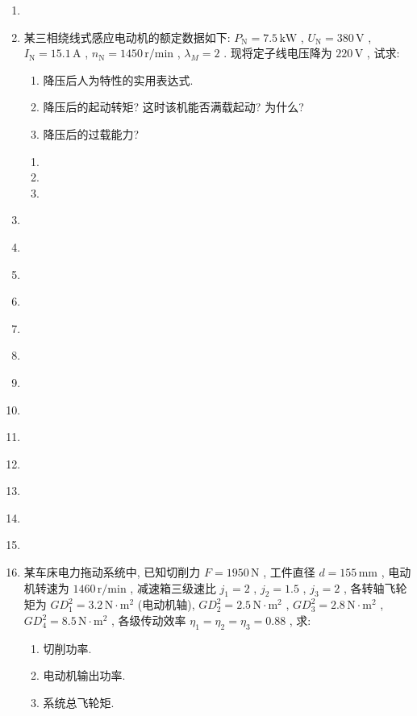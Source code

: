 \documentclass[lang=cn,11pt,marginpar=margintrue]{elegantbook}%
\newcommand{\zt}[1]{\,\mathrm{#1}}
\newcommand{\NN}{\mathrm{N}}
\begin{document}
\begin{enumerate}
	\item \label{js:11}
	




	\item \label{js:12}某三相绕线式感应电动机的额定数据如下: $P_{\NN}=7.5\zt{kW}$ , $U_{\NN}=380\zt{V}$ , $I_{\NN}=15.1\zt{A}$ , $n_{\NN}=1450\zt{r/min}$ , $\lambda_{M}=2$ . 现将定子线电压降为 $220\zt{V}$ , 试求:
	\begin{enumerate}
		\item 降压后人为特性的实用表达式.
		\item 降压后的起动转矩? 这时该机能否满载起动? 为什么?
		\item 降压后的过载能力?
	\end{enumerate}
	\begin{solution}
		\begin{enumerate}
			\item 
			\item 
			\item 
		\end{enumerate}
	\end{solution}
	\item \label{js:13}
	\item \label{js:14}
	\item \label{js:15}
	\item \label{js:16}
	\item \label{js:17}
	\item \label{js:18}
	\item \label{js:19}
	\item \label{js:20}
	\item \label{js:21}
	\item \label{js:22}
	\item \label{js:23}
	\item \label{js:24}
	\item \label{js:25}
	\item \label{js:26}某车床电力拖动系统中, 已知切削力 $F=1950\zt{N}$ , 工件直径 $d=155\zt{mm}$ , 电动机转速为 $1460\zt{r/min}$ ,  减速箱三级速比 $j_1=2$ , $j_2=1.5$ , $j_3=2$ , 各转轴飞轮矩为 $GD_1^2=3.2\zt{N\cdot m^2}$ (电动机轴), $GD_2^2=2.5\zt{N\cdot m^2}$ , $GD_3^2=2.8\zt{N\cdot m^2}$ , $GD_4^2=8.5\zt{N\cdot m^2}$ , 各级传动效率 $\eta_1=\eta_2=\eta_3=0.88$ , 求:
		\begin{enumerate}
			\item 切削功率.
			\item 电动机输出功率.
			\item 系统总飞轮矩.

\end{enumerate}
\end{enumerate}
\end{document}
